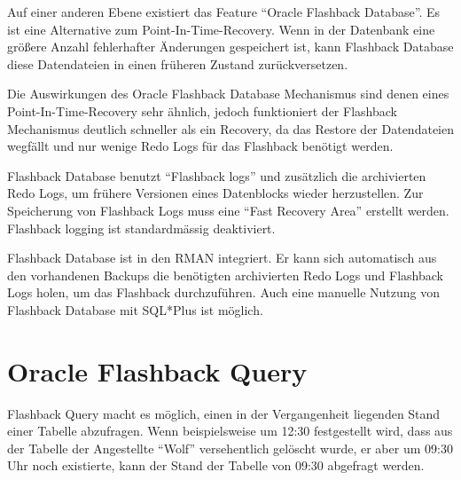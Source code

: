       Auf einer anderen Ebene existiert das Feature \enquote{Oracle Flashback Database}. Es ist eine Alternative zum Point-In-Time-Recovery. Wenn in der Datenbank eine größere Anzahl fehlerhafter Änderungen gespeichert ist, kann Flashback Database diese Datendateien in einen früheren Zustand zurückversetzen.

			Die Auswirkungen des Oracle Flashback Database Mechanismus sind denen eines Point-In-Time-Recovery sehr ähnlich, jedoch funktioniert der Flashback Mechanismus deutlich schneller als ein Recovery, da das Restore der Datendateien wegfällt und nur wenige Redo Logs für das Flashback benötigt werden.

      Flashback Database benutzt \enquote{Flashback logs} und zusätzlich die archivierten Redo Logs, um frühere Versionen eines Datenblocks wieder herzustellen. Zur Speicherung von Flashback Logs muss eine \enquote{Fast Recovery Area} erstellt werden. Flashback logging ist standardmässig deaktiviert.

      Flashback Database ist in den RMAN integriert. Er kann sich automatisch aus den vorhandenen Backups die benötigten archivierten Redo Logs und Flashback Logs holen, um das Flashback durchzuführen. Auch eine manuelle Nutzung von Flashback Database mit SQL*Plus ist möglich.
    \section{Oracle Flashback Query}
      Flashback Query macht es möglich, einen in der Vergangenheit liegenden Stand einer Tabelle abzufragen. Wenn beispielsweise um 12:30 festgestellt wird, dass aus der Tabelle  der Angestellte \enquote{Wolf} versehentlich gelöscht wurde, er aber um 09:30 Uhr noch existierte, kann der Stand der Tabelle  von 09:30 abgefragt werden.

